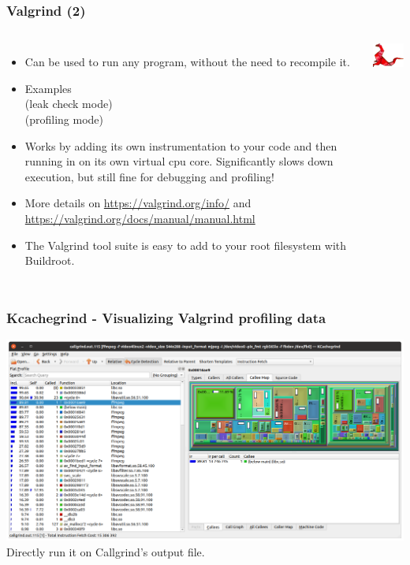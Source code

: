 \begin{frame}
  \frametitle{Valgrind (2)}
  \begin{columns}[T]
    \begin{itemize}
    \item Can be used to run any program, without the need to
      recompile it.
    \item Examples\\
      \small
       (leak check mode)\\
       (profiling mode)
      \normalsize
    \item Works by adding its own instrumentation to your code and
      then running in on its own virtual cpu core. Significantly slows
      down execution, but still fine for debugging and profiling!
    \item More details on \url{https://valgrind.org/info/} and
      \url{https://valgrind.org/docs/manual/manual.html}
    \item The Valgrind tool suite is easy to add to your root filesystem
          with Buildroot.
    \end{itemize}
    \includegraphics[width=\textwidth]{common/valgrind2.png}
  \end{columns}
\end{frame}

\begin{frame}
  \frametitle{Kcachegrind - Visualizing Valgrind profiling data}
    \includegraphics[width=\textwidth]{common/kcachegrind.png}
    \small Directly run it on Callgrind's output file.
\end{frame}
